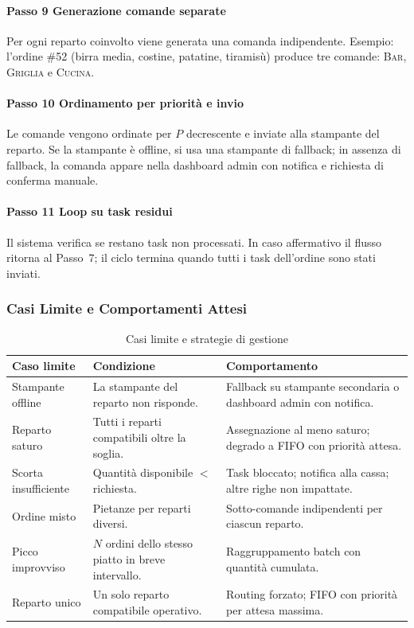 \paragraph{Passo 9  Generazione comande separate}
Per ogni reparto coinvolto viene generata una comanda indipendente. Esempio:
l'ordine \#52 (birra media, costine, patatine, tiramisù) produce tre comande:
\textsc{Bar}, \textsc{Griglia} e \textsc{Cucina}.

\paragraph{Passo 10  Ordinamento per priorità e invio}
Le comande vengono ordinate per $P$ decrescente e inviate alla stampante del
reparto. Se la stampante è offline, si usa una stampante di fallback; in assenza di
fallback, la comanda appare nella dashboard admin con notifica e richiesta di
conferma manuale.

\paragraph{Passo 11  Loop su task residui}
Il sistema verifica se restano task non processati. In caso affermativo il flusso
ritorna al Passo~7; il ciclo termina quando tutti i task dell'ordine sono stati
inviati.

\subsubsection*{Casi Limite e Comportamenti Attesi}

\begin{table}[H]
\centering
\caption{Casi limite e strategie di gestione}
\label{tab:casislimite}
\begin{tabular}{lp{4.5cm}p{5.5cm}}
\toprule
\textbf{Caso limite} & \textbf{Condizione} & \textbf{Comportamento} \\
\midrule
Stampante offline
    & La stampante del reparto non risponde.
    & Fallback su stampante secondaria o dashboard admin con notifica. \\
Reparto saturo
    & Tutti i reparti compatibili oltre la soglia.
    & Assegnazione al meno saturo; degrado a FIFO con priorità attesa. \\
Scorta insufficiente
    & Quantità disponibile $<$ richiesta.
    & Task bloccato; notifica alla cassa; altre righe non impattate. \\
Ordine misto
    & Pietanze per reparti diversi.
    & Sotto-comande indipendenti per ciascun reparto. \\
Picco improvviso
    & $N$ ordini dello stesso piatto in breve intervallo.
    & Raggruppamento batch con quantità cumulata. \\
Reparto unico
    & Un solo reparto compatibile operativo.
    & Routing forzato; FIFO con priorità per attesa massima. \\
\bottomrule
\end{tabular}
\end{table}

